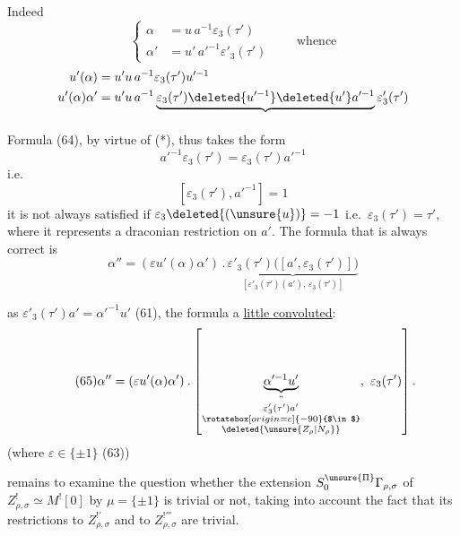 Indeed
\[
\left\{
\begin{aligned}
\alpha&=u\,a^{-1}\varepsilon_3(\tau')\\
\alpha'&=u'\,a'^{-1}\varepsilon'_3(\tau')
\end{aligned}
\right.
\qquad\text{whence}
\]
\[
\begin{aligned}
u'(\alpha)&=u'u\,a^{-1}\varepsilon_3(\tau')u'^{-1}\\
u'(\alpha)\alpha'&=u'u\,a^{-1}
\underbrace{\varepsilon_3(\tau')\deleted{u'^{-1}}\deleted{u'}a'^{-1}}_{\vphantom{A}}
\varepsilon'_3(\tau')
\end{aligned}
\]
Formula (64), by virtue of (*), thus takes the form
\[
a'^{-1}\varepsilon_3(\tau')=\varepsilon_3(\tau')a'^{-1}
\]
i.e.
\[
[\varepsilon_3(\tau'),a'^{-1}]=1
\]
it is not always satisfied if $\varepsilon_3\deleted{(\unsure{u})}=-1$
i.e.\ $\varepsilon_3(\tau')=\tau'$, where it represents  a
draconian restriction on $a'$. The formula that is always correct is
\[
\alpha''=(\varepsilon u'(\alpha)\alpha')\mathbin{.}
\underbrace{\varepsilon'_3(\tau')\bigl([a',\varepsilon_3(\tau')]\bigr)}_{[\varepsilon'_3(\tau')(a'),\,\varepsilon_3(\tau')]}
\]


as $\varepsilon'_3(\tau')a'=\alpha'^{-1}u'$ (61), the formula a \uline{little convoluted}:
\[
\tag{65}
\alpha''=(\varepsilon u'(\alpha)\alpha')\mathbin{.}
\left[
\underbrace{\alpha'^{-1}u'}_{\substack{
\text{''}\\
\varepsilon'_3(\tau')a'\\
\rotatebox[origin=c]{-90}{$\in$}\\
\deleted{\unsure{Z_\rho|N_\rho}}
}},\ \varepsilon_3(\tau')
\right].
\]
(where $\varepsilon\in\{\pm1\}$  (63))

 remains to examine the question whether the extension
 $S_0^{\unsure{\Pi}}\Gamma_{\rho,\sigma}$ of
$Z^!_{\rho,\sigma}\simeq M^![0]$ by $\mu=\{\pm1\}$ is trivial or not,
taking into account the fact that its restrictions to $Z^{!'}_{\rho,\sigma}$ and to
$Z^{!'''}_{\rho,\sigma}$ are trivial.

